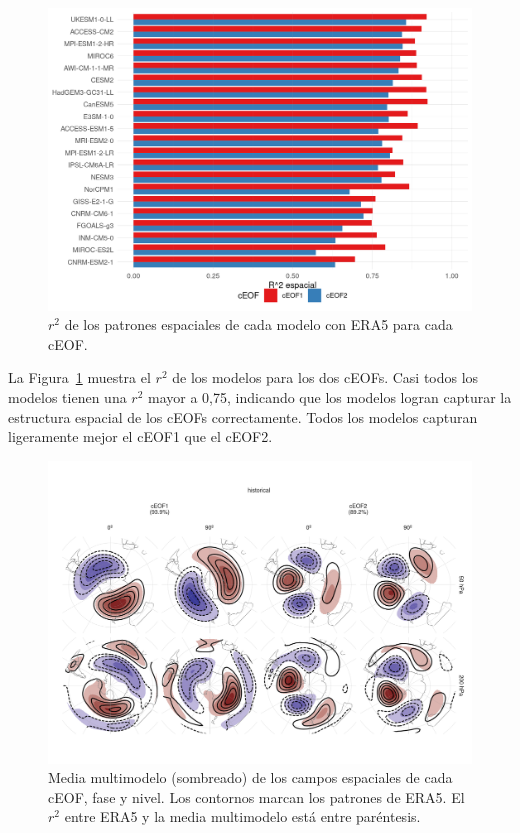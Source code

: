 \documentclass[12pt,oneside]{reedthesis}
\begin{document}
\begin{figure}
\includegraphics{figures/50-cmip6/comparacion-r2-1} \caption{\(r^2\) de los patrones espaciales de cada modelo con ERA5 para cada cEOF.}\label{fig:comparacion-r2}
\end{figure}

La Figura~\ref{fig:comparacion-r2} muestra el \(r^2\) de los modelos para los dos cEOFs.
Casi todos los modelos tienen una \(r^2\) mayor a 0,75, indicando que los modelos logran capturar la estructura espacial de los cEOFs correctamente.
Todos los modelos capturan ligeramente mejor el cEOF1 que el cEOF2.

\begin{figure}
\includegraphics{figures/50-cmip6/mmm-1} \caption{Media multimodelo (sombreado) de los campos espaciales de cada cEOF, fase y nivel. Los contornos marcan los patrones de ERA5. El \(r^2\) entre ERA5 y la media multimodelo está entre paréntesis.}\label{fig:mmm}
\end{figure}
\end{document}
